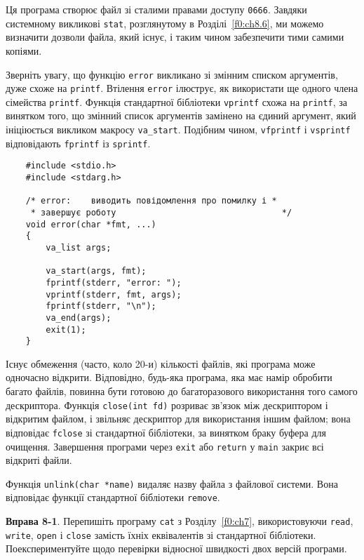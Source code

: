 \documentclass[a4paper,12pt]{book}
\begin{document}
  Ця програма створює файл зі сталими правами доступу \texttt{0666}. Завдяки системному
  викликові \texttt{stat}, розглянутому в Розділі~\ref{f0:ch8.6}, ми можемо
  визначити дозволи файла, який існує, і таким чином забезпечити тими самими копіями.

  Зверніть увагу, що функцію \texttt{error} викликано зі змінним списком аргументів, дуже
  схоже на \texttt{printf}. Втілення \texttt{error} ілюструє, як використати ще одного
  члена сімейства \texttt{printf}. Функція стандартної бібліотеки \texttt{vprintf} схожа
  на \texttt{printf}, за винятком того, що змінний список аргументів замінено на єдиний
  аргумент, який ініціюється викликом макросу \texttt{va\_start}. Подібним чином,
  \texttt{vfprintf} і \texttt{vsprintf} відповідають \texttt{fprintf} із \texttt{sprintf}.

  \begin{verbatim}
    #include <stdio.h>
    #include <stdarg.h>

    /* error:    виводить повідомлення про помилку і *
     * завершує роботу                                 */
    void error(char *fmt, ...)
    {
        va_list args;

        va_start(args, fmt);
        fprintf(stderr, "error: ");
        vprintf(stderr, fmt, args);
        fprintf(stderr, "\n");
        va_end(args);
        exit(1);
    }
  \end{verbatim}

  Існує обмеження (часто, коло 20-и) кількості файлів, які програма може одночасно
  відкрити. Відповідно, будь-яка програма, яка має намір обробити багато файлів, повинна
  бути готовою до багаторазового використання того самого дескриптора. Функція
  \texttt{close(int fd)} розриває зв'язок між дескриптором і відкритим файлом, і звільняє
  дескриптор для використання іншим файлом; вона відповідає \texttt{fclose} зі стандартної
  бібліотеки, за винятком браку буфера для очищення. Завершення програми через
  \texttt{exit} або \texttt{return} у \texttt{main} закриє всі відкриті файли.

  Функція \texttt{unlink(char *name)} видаляє назву файла з файлової системи. Вона
  відповідає функції стандартної бібліотеки \texttt{remove}.

  \textbf{Вправа 8-1}. Перепишіть програму \texttt{cat} з Розділу~\ref{f0:ch7},
  використовуючи \texttt{read}, \texttt{write}, \texttt{open} і \texttt{close} замість
  їхніх еквівалентів зі стандартної бібліотеки. Поекспериментуйте щодо перевірки відносної
  швидкості двох версій програми.
\end{document}
